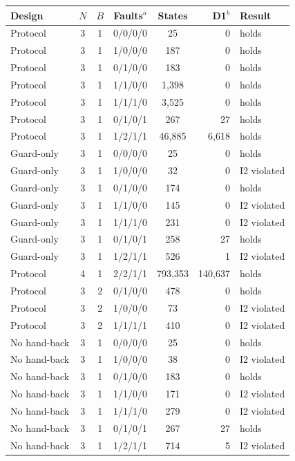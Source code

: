 
\begin{tabular}{@{}lccccrl@{}}
\toprule
Design & $N$ & $B$ & Faults$^a$ & States & D1$^b$ & Result \\
\midrule
Protocol & 3 & 1 & 0/0/0/0 & 25 & 0 & holds \\
Protocol & 3 & 1 & 1/0/0/0 & 187 & 0 & holds \\
Protocol & 3 & 1 & 0/1/0/0 & 183 & 0 & holds \\
Protocol & 3 & 1 & 1/1/0/0 & 1,398 & 0 & holds \\
Protocol & 3 & 1 & 1/1/1/0 & 3,525 & 0 & holds \\
Protocol & 3 & 1 & 0/1/0/1 & 267 & 27 & holds \\
Protocol & 3 & 1 & 1/2/1/1 & 46,885 & 6,618 & holds \\
Guard-only & 3 & 1 & 0/0/0/0 & 25 & 0 & holds \\
Guard-only & 3 & 1 & 1/0/0/0 & 32 & 0 & I2 violated \\
Guard-only & 3 & 1 & 0/1/0/0 & 174 & 0 & holds \\
Guard-only & 3 & 1 & 1/1/0/0 & 145 & 0 & I2 violated \\
Guard-only & 3 & 1 & 1/1/1/0 & 231 & 0 & I2 violated \\
Guard-only & 3 & 1 & 0/1/0/1 & 258 & 27 & holds \\
Guard-only & 3 & 1 & 1/2/1/1 & 526 & 1 & I2 violated \\
Protocol & 4 & 1 & 2/2/1/1 & 793,353 & 140,637 & holds \\
Protocol & 3 & 2 & 0/1/0/0 & 478 & 0 & holds \\
Protocol & 3 & 2 & 1/0/0/0 & 73 & 0 & I2 violated \\
Protocol & 3 & 2 & 1/1/1/1 & 410 & 0 & I2 violated \\
No hand-back & 3 & 1 & 0/0/0/0 & 25 & 0 & holds \\
No hand-back & 3 & 1 & 1/0/0/0 & 38 & 0 & I2 violated \\
No hand-back & 3 & 1 & 0/1/0/0 & 183 & 0 & holds \\
No hand-back & 3 & 1 & 1/1/0/0 & 171 & 0 & I2 violated \\
No hand-back & 3 & 1 & 1/1/1/0 & 279 & 0 & I2 violated \\
No hand-back & 3 & 1 & 0/1/0/1 & 267 & 27 & holds \\
No hand-back & 3 & 1 & 1/2/1/1 & 714 & 5 & I2 violated \\

\end{tabular}
